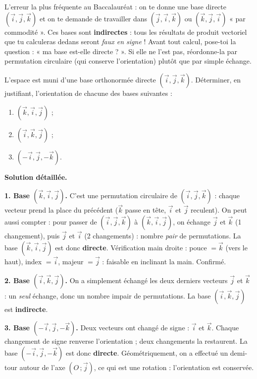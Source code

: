 \documentclass[11pt]{article}
\begin{document}
\begin{attention}
L'erreur la plus fréquente au Baccalauréat : on te donne une base directe $(\vec{i},\vec{j},\vec{k})$ et on te demande de travailler dans $(\vec{j},\vec{i},\vec{k})$ ou $(\vec{k},\vec{j},\vec{i})$ « par commodité ». Ces bases sont \textbf{indirectes} : tous les résultats de produit vectoriel que tu calculeras dedans seront \emph{faux en signe} ! Avant tout calcul, pose-toi la question : « ma base est-elle directe ? ». Si elle ne l'est pas, réordonne-la par permutation circulaire (qui conserve l'orientation) plutôt que par simple échange.
\end{attention}

\begin{exoresolu}
L'espace est muni d'une base orthonormée directe $(\vec{i},\vec{j},\vec{k})$. Déterminer, en justifiant, l'orientation de chacune des bases suivantes :
\begin{enumerate}
\item $(\vec{k},\vec{i},\vec{j})$ ;
\item $(\vec{i},\vec{k},\vec{j})$ ;
\item $(-\vec{i},\vec{j},-\vec{k})$.
\end{enumerate}
\tcblower
\textbf{Solution détaillée.}

\textbf{1. Base $(\vec{k},\vec{i},\vec{j})$.} C'est une permutation circulaire de $(\vec{i},\vec{j},\vec{k})$ : chaque vecteur prend la place du précédent ($\vec{k}$ passe en tête, $\vec{i}$ et $\vec{j}$ reculent). On peut aussi compter : pour passer de $(\vec{i},\vec{j},\vec{k})$ à $(\vec{k},\vec{i},\vec{j})$, on échange $\vec{j}$ et $\vec{k}$ (1 changement), puis $\vec{j}$ et $\vec{i}$ (2 changements) : nombre \emph{pair} de permutations. La base $(\vec{k},\vec{i},\vec{j})$ est donc \textbf{directe}. Vérification main droite : pouce $=\vec{k}$ (vers le haut), index $=\vec{i}$, majeur $=\vec{j}$ : faisable en inclinant la main. Confirmé.

\textbf{2. Base $(\vec{i},\vec{k},\vec{j})$.} On a simplement échangé les deux derniers vecteurs $\vec{j}$ et $\vec{k}$ : un \emph{seul} échange, donc un nombre impair de permutations. La base $(\vec{i},\vec{k},\vec{j})$ est \textbf{indirecte}.

\textbf{3. Base $(-\vec{i},\vec{j},-\vec{k})$.} Deux vecteurs ont changé de signe : $\vec{i}$ et $\vec{k}$. Chaque changement de signe renverse l'orientation ; deux changements la restaurent. La base $(-\vec{i},\vec{j},-\vec{k})$ est donc \textbf{directe}. Géométriquement, on a effectué un demi-tour autour de l'axe $(O\,;\vec{j})$, ce qui est une rotation : l'orientation est conservée.
\end{exoresolu}
\end{document}
